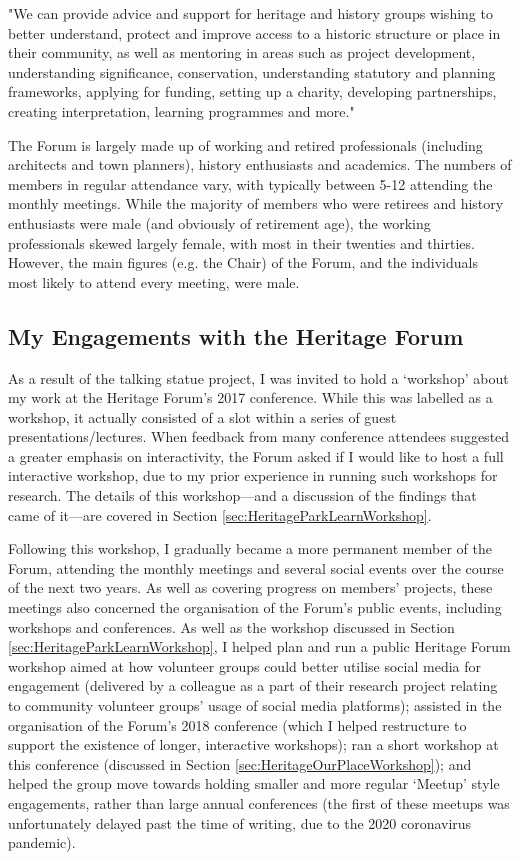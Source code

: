 \begin{displayquote}
"We can provide advice and support for heritage and history groups wishing to better understand, protect and improve access to a historic structure or place in their community, as well as mentoring in areas such as project development, understanding significance, conservation, understanding statutory and planning frameworks, applying for funding, setting up a charity, developing partnerships, creating interpretation, learning programmes and more."
\end{displayquote}

The Forum is largely made up of working and retired professionals (including architects and town planners), history enthusiasts and academics. The numbers of members in regular attendance vary, with typically between 5-12 attending the monthly meetings. While the majority of members who were retirees and history enthusiasts were male (and obviously of retirement age), the working professionals skewed largely female, with most in their twenties and thirties. However, the main figures (e.g. the Chair) of the Forum, and the individuals most likely to attend every meeting, were male.

\subsection{My Engagements with the Heritage Forum}
As a result of the talking statue project, I was invited to hold a `workshop' about my work at the Heritage Forum's 2017 conference. While this was labelled as a workshop, it actually consisted of a slot within a series of guest presentations/lectures. When feedback from many conference attendees suggested a greater emphasis on interactivity, the Forum asked if I would like to host a full interactive workshop, due to my prior experience in running such workshops for research. The details of this workshop---and a discussion of the findings that came of it---are covered in Section \ref{sec:HeritageParkLearnWorkshop}.

Following this workshop, I gradually became a more permanent member of the Forum, attending the monthly meetings and several social events over the course of the next two years. As well as covering progress on members' projects, these meetings also concerned the organisation of the Forum's public events, including workshops and conferences. As well as the workshop discussed in Section \ref{sec:HeritageParkLearnWorkshop}, I helped plan and run a public Heritage Forum workshop aimed at how volunteer groups could better utilise social media for engagement (delivered by a colleague as a part of their research project relating to community volunteer groups' usage of social media platforms); assisted in the organisation of the Forum's 2018 conference (which I helped restructure to support the existence of longer, interactive workshops); ran a short workshop at this conference (discussed in Section \ref{sec:HeritageOurPlaceWorkshop}); and helped the group move towards holding smaller and more regular `Meetup' style engagements, rather than large annual conferences (the first of these meetups was unfortunately delayed past the time of writing, due to the 2020 coronavirus pandemic).

